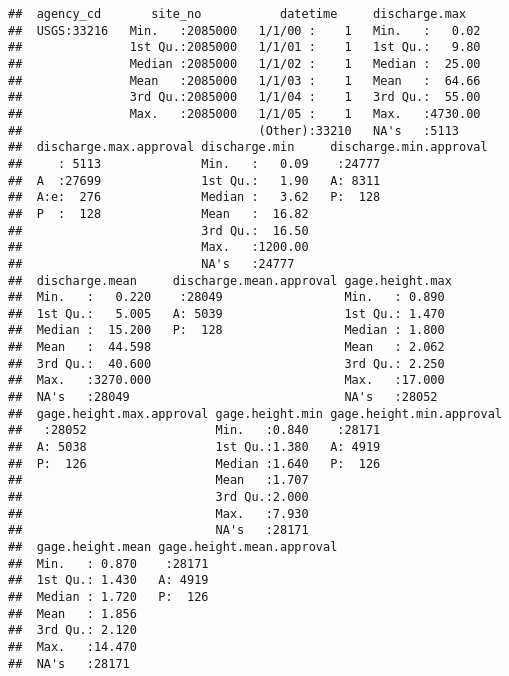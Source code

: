 \documentclass[]{article}
\begin{document}
\begin{verbatim}
##  agency_cd       site_no           datetime     discharge.max    
##  USGS:33216   Min.   :2085000   1/1/00 :    1   Min.   :   0.02  
##               1st Qu.:2085000   1/1/01 :    1   1st Qu.:   9.80  
##               Median :2085000   1/1/02 :    1   Median :  25.00  
##               Mean   :2085000   1/1/03 :    1   Mean   :  64.66  
##               3rd Qu.:2085000   1/1/04 :    1   3rd Qu.:  55.00  
##               Max.   :2085000   1/1/05 :    1   Max.   :4730.00  
##                                 (Other):33210   NA's   :5113     
##  discharge.max.approval discharge.min     discharge.min.approval
##     : 5113              Min.   :   0.09    :24777               
##  A  :27699              1st Qu.:   1.90   A: 8311               
##  A:e:  276              Median :   3.62   P:  128               
##  P  :  128              Mean   :  16.82                         
##                         3rd Qu.:  16.50                         
##                         Max.   :1200.00                         
##                         NA's   :24777                           
##  discharge.mean     discharge.mean.approval gage.height.max 
##  Min.   :   0.220    :28049                 Min.   : 0.890  
##  1st Qu.:   5.005   A: 5039                 1st Qu.: 1.470  
##  Median :  15.200   P:  128                 Median : 1.800  
##  Mean   :  44.598                           Mean   : 2.062  
##  3rd Qu.:  40.600                           3rd Qu.: 2.250  
##  Max.   :3270.000                           Max.   :17.000  
##  NA's   :28049                              NA's   :28052   
##  gage.height.max.approval gage.height.min gage.height.min.approval
##   :28052                  Min.   :0.840    :28171                 
##  A: 5038                  1st Qu.:1.380   A: 4919                 
##  P:  126                  Median :1.640   P:  126                 
##                           Mean   :1.707                           
##                           3rd Qu.:2.000                           
##                           Max.   :7.930                           
##                           NA's   :28171                           
##  gage.height.mean gage.height.mean.approval
##  Min.   : 0.870    :28171                  
##  1st Qu.: 1.430   A: 4919                  
##  Median : 1.720   P:  126                  
##  Mean   : 1.856                            
##  3rd Qu.: 2.120                            
##  Max.   :14.470                            
##  NA's   :28171
\end{verbatim}
\end{document}
